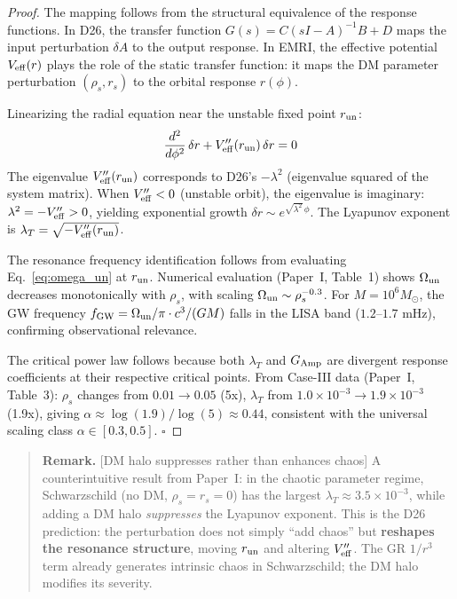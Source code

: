 \documentclass[
]{article}
\newenvironment{remark}{\begin{quote}\textbf{Remark.} }{\end{quote}}
\begin{document}
\begin{proof}
The mapping follows from the structural equivalence of the response functions. In D26, the transfer function $G(s) = C(sI - A)^{-1}B + D$ maps the input perturbation $\delta A$ to the output response. In EMRI, the effective potential $V_{\rm eff}(r)$ plays the role of the static transfer function: it maps the DM parameter perturbation $(\rho_s, r_s)$ to the orbital response $r(\phi)$.

Linearizing the radial equation near the unstable fixed point $r_{\rm un}$:
\begin{equation}
\frac{d^2}{d\phi^2}\,\delta r + V_{\rm eff}''(r_{\rm un})\,\delta r = 0
\end{equation}
The eigenvalue $V_{\rm eff}''(r_{\rm un})$ corresponds to D26's $- \lambda^2$ (eigenvalue squared of the system matrix). When $V_{\rm eff}'' < 0$ (unstable orbit), the eigenvalue is imaginary: $\lambda^2 = -V_{\rm eff}'' > 0$, yielding exponential growth $\delta r \sim e^{\sqrt{\lambda^2}\,\phi}$. The Lyapunov exponent is $\lambda_T = \sqrt{-V_{\rm eff}''(r_{\rm un})}$.

The resonance frequency identification follows from evaluating Eq.~\eqref{eq:omega_un} at $r_{\rm un}$. Numerical evaluation (Paper~I, Table~1) shows $\Omega_{\rm un}$ decreases monotonically with $\rho_s$, with scaling $\Omega_{\rm un} \sim \rho_s^{-0.3}$. For $M = 10^6 M_\odot$, the GW frequency $f_{\rm GW} = \Omega_{\rm un}/\pi \cdot c^3/(GM)$ falls in the LISA band ($1.2$--$1.7$ mHz), confirming observational relevance.

The critical power law follows because both $\lambda_T$ and $G_{\rm Amp}$ are divergent response coefficients at their respective critical points. From Case-III data (Paper~I, Table~3): $\rho_s$ changes from $0.01 \to 0.05$ (5x), $\lambda_T$ from $1.0 \times 10^{-3} \to 1.9 \times 10^{-3}$ (1.9x), giving $\alpha \approx \log(1.9)/\log(5) \approx 0.44$, consistent with the universal scaling class $\alpha \in [0.3, 0.5]$. $\square$
\end{proof}

\begin{remark}[DM halo suppresses rather than enhances chaos]
A counterintuitive result from Paper~I: in the chaotic parameter regime, Schwarzschild (no DM, $\rho_s = r_s = 0$) has the largest $\lambda_T \approx 3.5 \times 10^{-3}$, while adding a DM halo \textit{suppresses} the Lyapunov exponent. This is the D26 prediction: the perturbation does not simply ``add chaos'' but \textbf{reshapes the resonance structure}, moving $r_{\rm un}$ and altering $V_{\rm eff}''$. The GR $1/r^3$ term already generates intrinsic chaos in Schwarzschild; the DM halo modifies its severity.
\end{remark}
\end{document}
